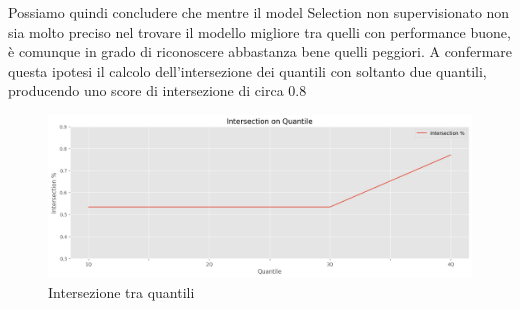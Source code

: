 Possiamo quindi concludere che mentre il model Selection non supervisionato non sia molto preciso nel trovare il modello migliore tra quelli con performance buone, è comunque in grado di riconoscere abbastanza bene quelli peggiori. A confermare questa ipotesi il calcolo dell'intersezione dei quantili con soltanto due quantili, producendo uno score di intersezione di circa \(0.8\)

\begin{figure}[t]
	\centering
	\includegraphics[width=14cm, scale=1]{images/4quantile}
	\caption{Intersezione tra quantili}
	\label{quantile-intersection}
		
\end{figure}


\newpage
